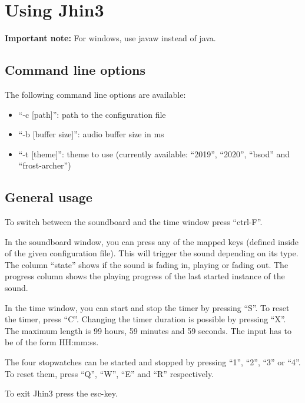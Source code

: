 \section{Using Jhin3}

\textbf{Important note:} For windows, use javaw instead of java.

\subsection{Command line options}

The following command line options are available:
\begin{itemize}
\item ``-c [path]'': path to the configuration file
\item ``-b [buffer size]'': audio buffer size in ms
\item ``-t [theme]'': theme to use (currently available: ``2019'', ``2020'', ``bsod'' and ``frost-archer'')
\end{itemize}

\subsection{General usage}

To switch between the soundboard and the time window press ``ctrl-F''.

In the soundboard window, you can press any of the mapped keys (defined inside of the given configuration file). This will trigger the sound depending on its type.
The column ``state'' shows if the sound is fading in, playing or fading out. The progress column shows the playing progress of the last started instance of the sound.

In the time window, you can start and stop the timer by pressing ``S''. To reset the timer, press ``C''.
Changing the timer duration is possible by pressing ``X''. The maximum length is 99 hours, 59 minutes and 59 seconds. The input has to be of the form HH:mm:ss.

The four stopwatches can be started and stopped by pressing ``1'', ``2'', ``3'' or ``4''. To reset them, press ``Q'', ``W'', ``E'' and ``R'' respectively.

To exit Jhin3 press the esc-key.